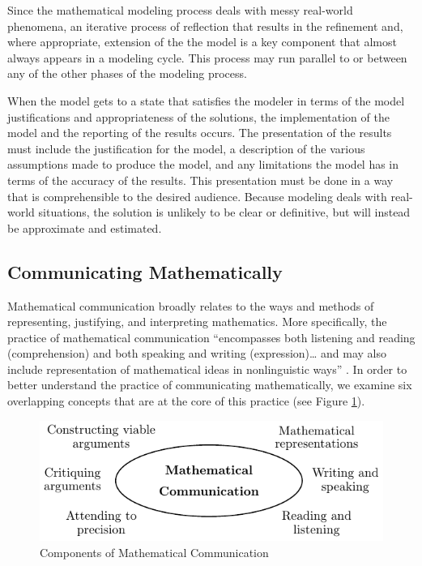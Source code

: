 \documentclass[
]{book}
\theoremstyle{definition}
\theoremstyle{definition}
\theoremstyle{definition}
\theoremstyle{definition}
\theoremstyle{remark}
\begin{document}
Since the mathematical modeling process deals with messy real-world phenomena, an iterative process of reflection that results in the refinement and, where appropriate, extension of the the model is a key component that almost always appears in a modeling cycle. This process may run parallel to or between any of the other phases of the modeling process.

When the model gets to a state that satisfies the modeler in terms of the model justifications and appropriateness of the solutions, the implementation of the model and the reporting of the results occurs. The presentation of the results must include the justification for the model, a description of the various assumptions made to produce the model, and any limitations the model has in terms of the accuracy of the results. This presentation must be done in a way that is comprehensible to the desired audience. Because modeling deals with real-world situations, the solution is unlikely to be clear or definitive, but will instead be approximate and estimated.

\hypertarget{communicating-mathematically}{%
\subsection{Communicating Mathematically}\label{communicating-mathematically}}

Mathematical communication broadly relates to the ways and methods of representing, justifying, and interpreting mathematics. More specifically, the practice of mathematical communication ``encompasses both listening and reading (comprehension) and both speaking and writing (expression)\ldots{} and may also include representation of mathematical ideas in nonlinguistic ways'' \citep[p.~7]{Communication}. In order to better understand the practice of communicating mathematically, we examine six overlapping concepts that are at the core of this practice (see Figure \ref{fig:communication}).

\begin{figure}

{\centering \includegraphics[width=0.6\linewidth]{tikz/communication} 

}

\caption{Components of Mathematical Communication}\label{fig:communication}
\end{figure}
\end{document}
